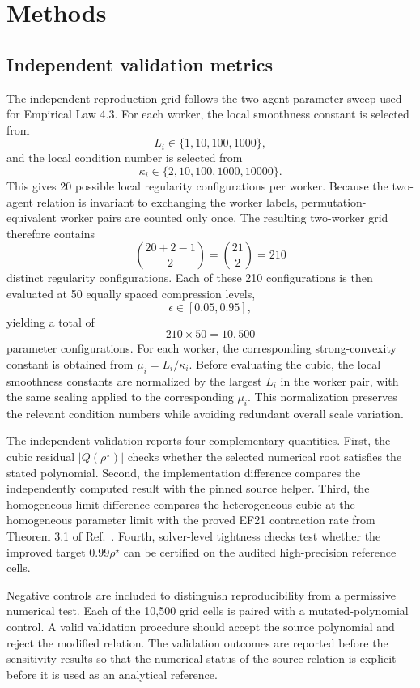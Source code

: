 \section{Methods}

\subsection{Independent validation metrics}

The independent reproduction grid follows the two-agent parameter sweep used for Empirical Law 4.3. For each worker, the local smoothness constant is selected from
\[
L_i\in\{1,10,100,1000\},
\]
and the local condition number is selected from
\[
\kappa_i\in\{2,10,100,1000,10000\}.
\]
This gives 20 possible local regularity configurations per worker. Because the two-agent relation is invariant to exchanging the worker labels, permutation-equivalent worker pairs are counted only once. The resulting two-worker grid therefore contains
\[
\binom{20+2-1}{2}=\binom{21}{2}=210
\]
distinct regularity configurations. Each of these 210 configurations is then evaluated at 50 equally spaced compression levels,
\[
\epsilon\in[0.05,0.95],
\]
yielding a total of
\[
210\times50=10{,}500
\]
parameter configurations. For each worker, the corresponding strong-convexity constant is obtained from $\mu_i=L_i/\kappa_i$. Before evaluating the cubic, the local smoothness constants are normalized by the largest $L_i$ in the worker pair, with the same scaling applied to the corresponding $\mu_i$. This normalization preserves the relevant condition numbers while avoiding redundant overall scale variation.

The independent validation reports four complementary quantities. First, the cubic residual $|Q(\rho^\star)|$ checks whether the selected numerical root satisfies the stated polynomial. Second, the implementation difference compares the independently computed result with the pinned source helper. Third, the homogeneous-limit difference compares the heterogeneous cubic at the homogeneous parameter limit with the proved EF21 contraction rate from Theorem 3.1 of Ref.~\cite{thomsen2026tight}. Fourth, solver-level tightness checks test whether the improved target $0.99\rho^\star$ can be certified on the audited high-precision reference cells.

Negative controls are included to distinguish reproducibility from a permissive numerical test. Each of the 10,500 grid cells is paired with a mutated-polynomial control. A valid validation procedure should accept the source polynomial and reject the modified relation. The validation outcomes are reported before the sensitivity results so that the numerical status of the source relation is explicit before it is used as an analytical reference.

